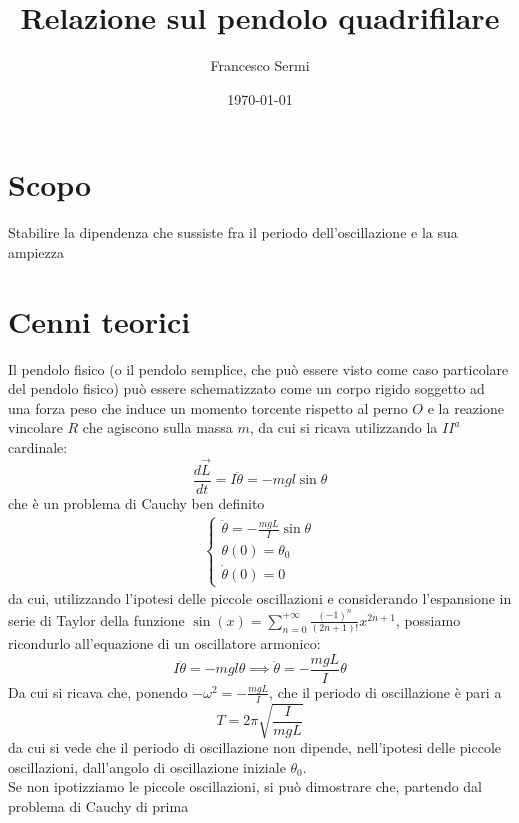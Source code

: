 \documentclass{article}
\title{Relazione sul pendolo quadrifilare}
\author{Francesco Sermi}
\date{\today}
\begin{document}
	\maketitle
	\newpage
	\tableofcontents
	\newpage
	\section{Scopo}
		Stabilire la dipendenza che sussiste fra il periodo dell'oscillazione e la sua ampiezza
	\section{Cenni teorici}
	Il pendolo fisico (o il pendolo semplice, che può essere visto come caso particolare del pendolo fisico) può essere schematizzato come un corpo rigido soggetto ad una forza peso che induce un momento torcente rispetto al perno $O$ e la reazione vincolare $R$ che agiscono sulla massa $m$, da cui si ricava utilizzando la $II^a$ cardinale:
	\begin{equation}
		\frac{d\vec{L}}{dt} = I\ddot{\theta} = -mgl\sin{\theta}
	\end{equation}
	che è un problema di Cauchy ben definito
	\begin{align}
		\begin{cases*}
			\ddot{\theta} = - \frac{mgL}{I} \sin{\theta} \\
			\theta(0) = \theta_0 \\
			\dot{\theta}(0) = 0
		\end{cases*}
	\end{align}
	da cui, utilizzando l'ipotesi delle piccole oscillazioni e considerando l'espansione in serie di Taylor della funzione $\sin{(x)} = \sum\limits_{n=0}^{+\infty} \frac{(-1)^n}{(2n+1)!} x^{2n+1}$, possiamo ricondurlo all'equazione di un oscillatore armonico:
	\begin{equation*}
		I\ddot{\theta} = -mgl\theta \implies \ddot\theta = -\frac{mgL}{I}\theta
	\end{equation*}
	Da cui si ricava che, ponendo $-\omega^2 = -\frac{mgL}{I}$, che il periodo di oscillazione è pari a
	\begin{equation*}
		T = 2\pi \sqrt{\frac{I}{mgL}}
	\end{equation*}
	da cui si vede che il periodo di oscillazione non dipende, nell'ipotesi delle piccole oscillazioni, dall'angolo di oscillazione iniziale $\theta_0$. \\	
	Se non ipotizziamo le piccole oscillazioni, si può dimostrare che, partendo dal problema di Cauchy di prima
\end{document}
